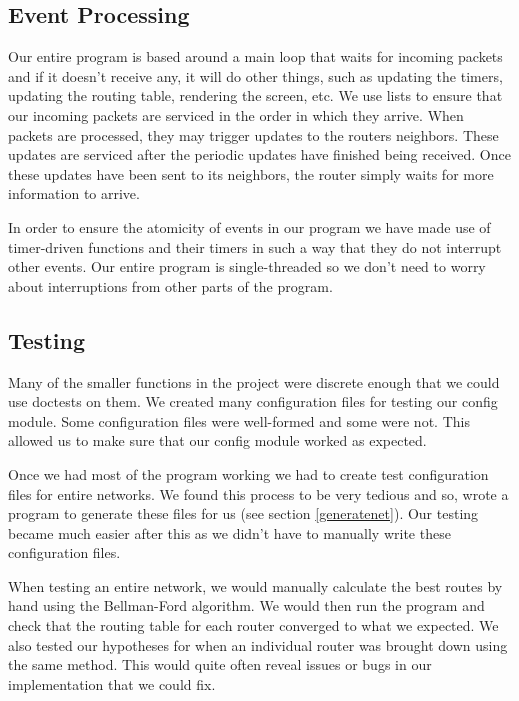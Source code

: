 \documentclass[11pt]{article} %
\begin{document}
\subsection{Event Processing} \label{event_processing}

Our entire program is based around a main loop that waits for incoming packets and if it doesn't receive any, it will do other things, such as updating the timers, updating the routing table, rendering the screen, etc. We use lists to ensure that our incoming packets are serviced in the order in which they arrive. When packets are processed, they may trigger updates to the routers neighbors. These updates are serviced after the periodic updates have finished being received. Once these updates have been sent to its neighbors, the router simply waits for more information to arrive.

In order to ensure the atomicity of events in our program we have made use of timer-driven functions and their timers in such a way that they do not  interrupt other events. Our entire program is single-threaded so we don't need to worry about interruptions from other parts of the program.


\subsection{Testing} \label{testing}

Many of the smaller functions in the project were discrete enough that we could use doctests on them.
We created many configuration files for testing our config module. Some configuration files were well-formed and some were not. This allowed us to make sure that our config module worked as expected.

Once we had most of the program working we had to create test configuration files for entire networks. We found this process to be very tedious and so, wrote a program to generate these files for us (see section \ref{generatenet}). Our testing became much easier after this as we didn't have to manually write these configuration files.

When testing an entire network, we would manually calculate the best routes by hand using the Bellman-Ford algorithm. We would then run the program and check that the routing table for each router converged to what we expected. We also tested our hypotheses for when an individual router was brought down using the same method. This would quite often reveal issues or bugs in our implementation that we could fix.
\end{document}
